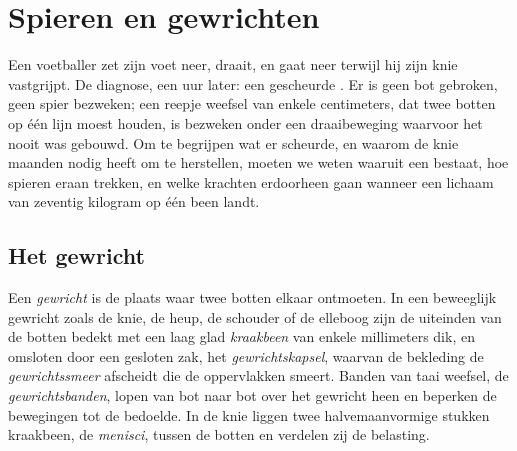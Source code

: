 \chapter{Spieren en gewrichten}\label{ch:g10:muscles-and-joints}

Een voetballer zet zijn voet neer, draait, en gaat neer terwijl hij zijn
knie vastgrijpt. De diagnose, een uur later: een gescheurde
. Er is geen bot gebroken, geen spier bezweken; een reepje
weefsel van enkele centimeters, dat twee botten op één lijn moest
houden, is bezweken onder een draaibeweging waarvoor het nooit was
gebouwd. Om te begrijpen wat er scheurde, en waarom de knie maanden
nodig heeft om te herstellen, moeten we weten waaruit een 
bestaat, hoe spieren eraan trekken, en welke krachten erdoorheen gaan
wanneer een lichaam van zeventig kilogram op één been landt.

\section{Het gewricht}

\begin{definition}[Gewricht]\label{def:g10:muscles-and-joints:joint}
Een \emph{gewricht} is de plaats waar twee botten elkaar
ontmoeten. In een beweeglijk gewricht zoals de knie, de heup, de
schouder of de elleboog zijn de uiteinden van de botten bedekt met een
laag glad \emph{kraakbeen} van enkele millimeters dik,
en omsloten door een gesloten zak, het \emph{gewrichtskapsel}, waarvan de
bekleding de \emph{gewrichtssmeer} afscheidt die de oppervlakken smeert.
Banden van taai weefsel, de
\emph{gewrichtsbanden}, lopen van bot naar bot over
het gewricht heen en beperken de bewegingen tot de bedoelde. In de knie
liggen twee halvemaanvormige stukken kraakbeen, de \emph{menisci},
tussen de botten en verdelen zij de belasting.
\end{definition}

